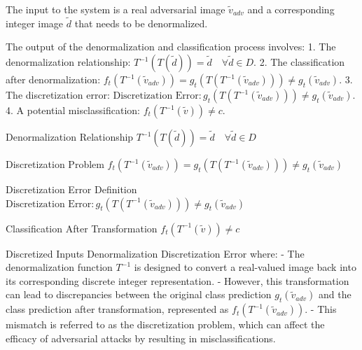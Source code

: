 
The input to the system is a real adversarial image $\tilde{v}_{adv}$ and a corresponding integer image $\tilde{d}$ that needs to be denormalized.

The output of the denormalization and classification process involves:
1. The denormalization relationship: $T^{-1}(T(\tilde{d})) = \tilde{d} \quad \forall \tilde{d} \in D$.
2. The classification after denormalization: $f_t(T^{-1}(\tilde{v}_{adv})) = g_t(T(T^{-1}(\tilde{v}_{adv}))) \neq g_t(\tilde{v}_{adv})$.
3. The discretization error: $\text{Discretization Error} : g_t(T(T^{-1}(\tilde{v}_{adv}))) \neq g_t(\tilde{v}_{adv})$.
4. A potential misclassification: $f_t(T^{-1}(\tilde{v})) \neq c$.

Denormalization Relationship
$T^{-1}(T(\tilde{d})) = \tilde{d} \quad \forall \tilde{d} \in D$

Discretization Problem
$f_t(T^{-1}(\tilde{v}_{adv})) = g_t(T(T^{-1}(\tilde{v}_{adv}))) \neq g_t(\tilde{v}_{adv})$

Discretization Error Definition
$\text{Discretization Error} : g_t(T(T^{-1}(\tilde{v}_{adv}))) \neq g_t(\tilde{v}_{adv})$

Classification After Transformation
$f_t(T^{-1}(\tilde{v})) \neq c$

Discretized Inputs Denormalization Discretization Error where:
- The denormalization function $T^{-1}$ is designed to convert a real-valued image back into its corresponding discrete integer representation.
- However, this transformation can lead to discrepancies between the original class prediction $g_t(\tilde{v}_{adv})$ and the class prediction after transformation, represented as $f_t(T^{-1}(\tilde{v}_{adv}))$.
- This mismatch is referred to as the discretization problem, which can affect the efficacy of adversarial attacks by resulting in misclassifications.